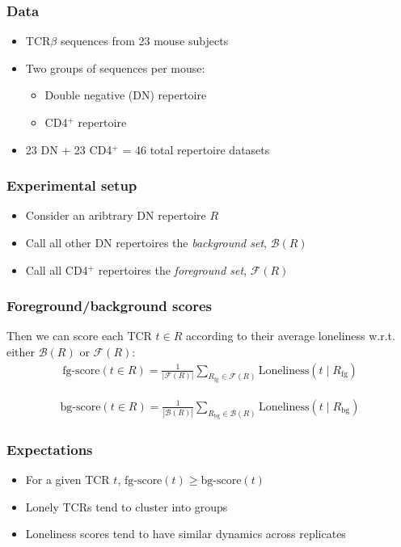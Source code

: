 \documentclass[mathserif,compress,xcolor={dvipsnames}]{beamer}
\newcommand*\ba{\[ \begin{aligned}}
\newcommand*\ea{\end{aligned} \]}
\renewcommand\;{\,}
\begin{document}
\begin{frame}\frametitle{Data}
\begin{itemize}
\item
TCR$\beta$ sequences from 23 mouse subjects
\bigskip
\item
Two groups of sequences per mouse:
\medskip
\begin{itemize}
\item
Double negative (DN) repertoire
\medskip
\item
CD4$^+$ repertoire
\end{itemize}
\bigskip
\item
23 DN + 23 CD4$^+$ = 46 total repertoire datasets
\end{itemize}
\end{frame}

\begin{frame}\frametitle{Experimental setup}
\begin{itemize}
\item
Consider an aribtrary DN repertoire $R$
\bigskip
\item
Call all other DN repertoires the {\em background set}, $\mathcal B(R)$
\bigskip
\item
Call all CD4$^+$ repertoires the {\em foreground set}, $\mathcal F(R)$
\end{itemize}
\end{frame}

\begin{frame}\frametitle{Foreground/background scores}
Then we can score each TCR $t \in R$ according to their average loneliness w.r.t. either $\mathcal B(R)$ or $\mathcal F(R)$:
\bigskip
\ba
\text{fg-score}(t \in R) = \frac{1}{\left|\mathcal F(R)\right|} \sum_{R_\text{fg} \in \mathcal F(R)} \text{Loneliness}\left(t \mid R_\text{fg}\right)
\ea

\ba
\text{bg-score}(t \in R) = \frac{1}{\left|\mathcal B(R)\right|} \sum_{R_\text{bg} \in \mathcal B(R)} \text{Loneliness}\left(t \mid R_\text{bg}\right)
\ea
\end{frame}

\begin{frame}\frametitle{Expectations}
\begin{itemize}
\item
For a given TCR $t$, $\text{fg-score}(t) \ge \text{bg-score}(t)$
\bigskip
\item
Lonely TCRs tend to cluster into groups
\bigskip
\item
Loneliness scores tend to have similar dynamics across replicates
\end{itemize}
\end{frame}
\end{document}
